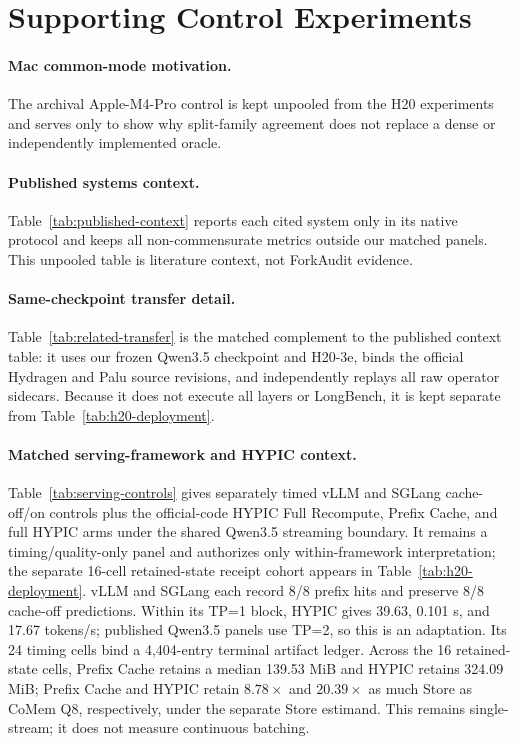 \documentclass{article}
\begin{document}
\FloatBarrier

\section{Supporting Control Experiments}
\label{app:controls}

\paragraph{Mac common-mode motivation.}
The archival Apple-M4-Pro control is kept unpooled from the H20 experiments and
serves only to show why split-family agreement does not replace a dense or
independently implemented oracle.


\paragraph{Published systems context.}
Table~\ref{tab:published-context} reports each cited system only in its native
protocol and keeps all non-commensurate metrics outside our matched panels.
This unpooled table is literature context, not ForkAudit evidence.


\paragraph{Same-checkpoint transfer detail.}
Table~\ref{tab:related-transfer} is the matched complement to the published
context table: it uses our frozen Qwen3.5 checkpoint and H20-3e, binds the
official Hydragen and Palu source revisions, and independently replays all raw
operator sidecars.  Because it does not execute all layers or LongBench, it is
kept separate from Table~\ref{tab:h20-deployment}.


\paragraph{Matched serving-framework and HYPIC context.}
Table~\ref{tab:serving-controls} gives separately timed vLLM and SGLang
cache-off/on controls plus the official-code HYPIC Full Recompute, Prefix
Cache, and full HYPIC arms under the shared Qwen3.5 streaming boundary.  It
remains a timing/quality-only panel and authorizes only within-framework
interpretation; the separate 16-cell retained-state receipt cohort appears in
Table~\ref{tab:h20-deployment}.
vLLM and SGLang each record 8/8 prefix hits and preserve 8/8 cache-off
predictions.  Within its TP=1 block, HYPIC gives 39.63, 0.101 s, and 17.67
tokens/s; published Qwen3.5 panels use TP=2, so this is an adaptation.  Its 24
timing cells bind a 4,404-entry terminal artifact ledger.  Across the
16 retained-state cells, Prefix Cache retains a median 139.53 MiB and HYPIC
retains 324.09 MiB; Prefix Cache and HYPIC retain $8.78\times$ and
$20.39\times$ as much Store as CoMem Q8, respectively, under the separate
Store estimand.  This remains single-stream; it does not measure continuous
batching.

\end{document}
